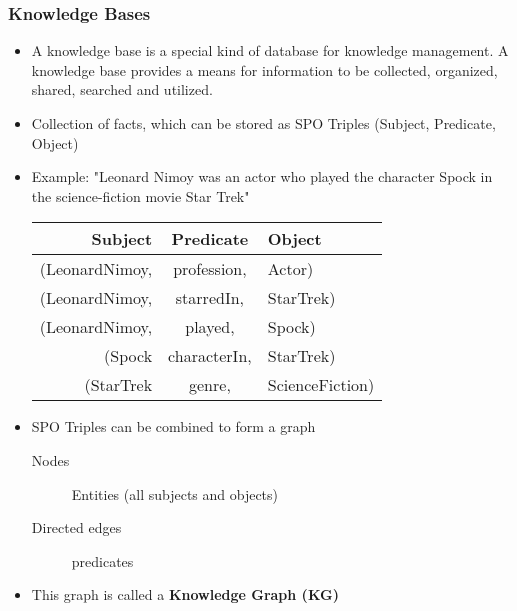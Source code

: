 			\subsubsection{Knowledge Bases}
				\begin{itemize}
					\item A knowledge base is a special kind of database for knowledge management. A knowledge base provides a means for information to be collected, organized, shared, searched and utilized.
					\item Collection of facts, which can be stored as SPO Triples (Subject, Predicate, Object)
					\item Example: "Leonard Nimoy was an actor who played the character Spock in the science-fiction movie Star Trek"
						\begin{table}[H]
							\centering
							\begin{tabular}{r | c | l}
								\textbf{Subject} & \textbf{Predicate} & \textbf{Object} \\ \hline
								(LeonardNimoy,   & profession,        & Actor)          \\
								(LeonardNimoy,   & starredIn,         & StarTrek)       \\
								(LeonardNimoy,   & played,            & Spock)          \\
								(Spock           & characterIn,       & StarTrek)       \\
								(StarTrek        & genre,             & ScienceFiction) \\
							\end{tabular}
						\end{table}
					\item SPO Triples can be combined to form a graph
						\begin{description}
							\item[Nodes] Entities (all subjects and objects)
							\item[Directed edges] predicates
						\end{description}
					\item This graph is called a \textbf{Knowledge Graph (KG)}
				\end{itemize}
